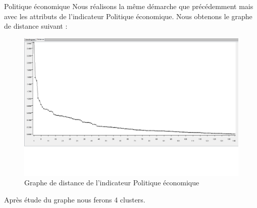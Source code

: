 \item Politique économique
Nous réalisons la même démarche que précédemment mais avec les attributs de l'indicateur Politique économique. Nous obtenons le graphe de distance suivant : 
\begin{figure}[H]
	\begin{center}
		\includegraphics[scale=0.5]{Image/DistancePolitiqueNoMissing2}
		\caption{Graphe de distance de l'indicateur Politique économique\jeuc}
	\end{center}
\end{figure}

Après étude du graphe nous ferons 4 clusters.